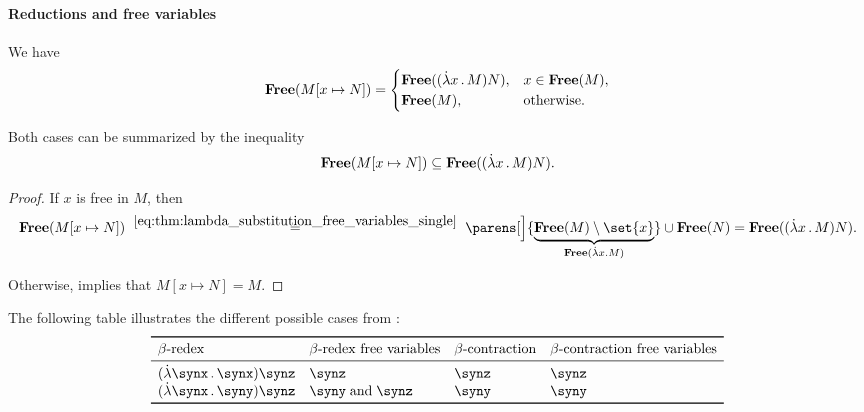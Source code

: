 \paragraph{Reductions and free variables}

\begin{lemma}\label{thm:beta_contractum_free_variables}
  We have
  \begin{equation}\label{eq:thm:beta_contractum_free_variables/equality}
    \op*{Free}(M[x \mapsto N]) = \begin{cases}
      \op*{Free}((\qabs x M) N), &x \in \op*{Free}(M), \\
      \op*{Free}(M),             &\T{otherwise.} \\
    \end{cases}
  \end{equation}

  Both cases can be summarized by the inequality
  \begin{equation}\label{eq:thm:beta_contractum_free_variables/inequality}
    \op*{Free}(M[x \mapsto N]) \subseteq \op*{Free}((\qabs x M) N).
  \end{equation}
\end{lemma}
\begin{proof}
  If \( x \) is free in \( M \), then
  \begin{equation*}
    \op*{Free}(M[x \mapsto N])
    \reloset {\eqref{eq:thm:lambda_substitution_free_variables_single}} =
    \parens[\Big]{ \underbrace{ \op*{Free}(M) \setminus \set{ x } }_{\op*{Free}(\qabs x M)} } \cup \op*{Free}(N)
    =
    \op*{Free}((\qabs x M) N).
  \end{equation*}

  Otherwise,  implies that \( M[x \mapsto N] = M \).
\end{proof}

\begin{example}\label{ex:thm:lambda_term_reduction_free_variables}
  The following table illustrates the different possible cases from :
  \begin{equation*}
    \begin{array}{*{4}{l}}
      \toprule
      \T{\( \beta \)-redex}     & \T{\( \beta \)-redex free variables} & \T{\( \beta \)-contraction} & \T{\( \beta \)-contraction free variables} \\
      \midrule
      (\qabs \synx \synx) \synz & \synz                                & \synz                       & \synz                                      \\
      (\qabs \synx \syny) \synz & \syny \T{and} \synz                  & \syny                       & \syny                                      \\
      \bottomrule
    \end{array}
  \end{equation*}
\end{example}

